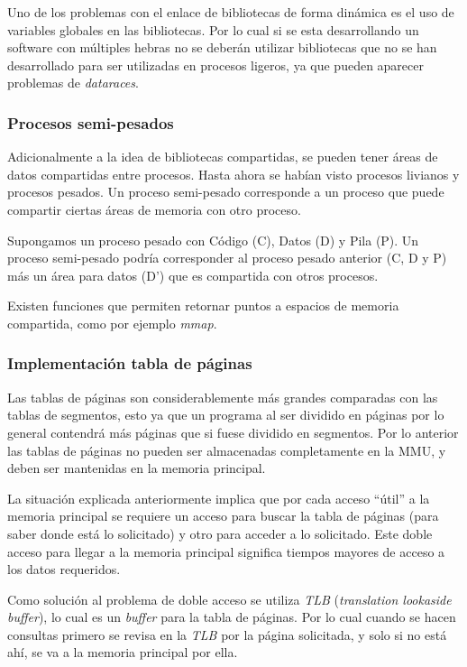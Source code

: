 Uno de los problemas con el enlace de bibliotecas de forma dinámica es el uso de
variables globales en las bibliotecas. Por lo cual si se esta desarrollando un
software con múltiples hebras no se deberán utilizar bibliotecas que no se han
desarrollado para ser utilizadas en procesos ligeros, ya que pueden aparecer
problemas de \textit{dataraces}.

\subsubsection{Procesos semi-pesados}

Adicionalmente a la idea de bibliotecas compartidas, se pueden tener áreas de
datos compartidas entre procesos. Hasta ahora se habían visto procesos livianos
y procesos pesados. Un proceso semi-pesado corresponde a un proceso que puede
compartir ciertas áreas de memoria con otro proceso.

Supongamos un proceso pesado con Código (C), Datos (D) y Pila (P). Un proceso
semi-pesado podría corresponder al proceso pesado anterior (C, D y P) más un
área para datos (D') que es compartida con otros procesos.

Existen funciones que permiten retornar puntos a espacios de memoria compartida,
como por ejemplo \textit{mmap}.

\subsubsection{Implementación tabla de páginas}

Las tablas de páginas son considerablemente más grandes comparadas con las
tablas de segmentos, esto ya que un programa al ser dividido en páginas por lo
general contendrá más páginas que si fuese dividido en segmentos. Por lo
anterior las tablas de páginas no pueden ser almacenadas completamente en la
MMU, y deben ser mantenidas en la memoria principal.

La situación explicada anteriormente implica que por cada acceso ``útil'' a la
memoria principal se requiere un acceso para buscar la tabla de páginas (para
saber donde está lo solicitado) y otro para acceder a lo solicitado. Este doble
acceso para llegar a la memoria principal significa tiempos mayores de acceso a
los datos requeridos.

Como solución al problema de doble acceso se utiliza \textit{TLB}
(\textit{translation lookaside buffer}), lo cual es un \textit{buffer} para la
tabla de páginas. Por lo cual cuando se hacen consultas primero se revisa en la
\textit{TLB} por la página solicitada, y solo si no está ahí, se va a la memoria
principal por ella.

